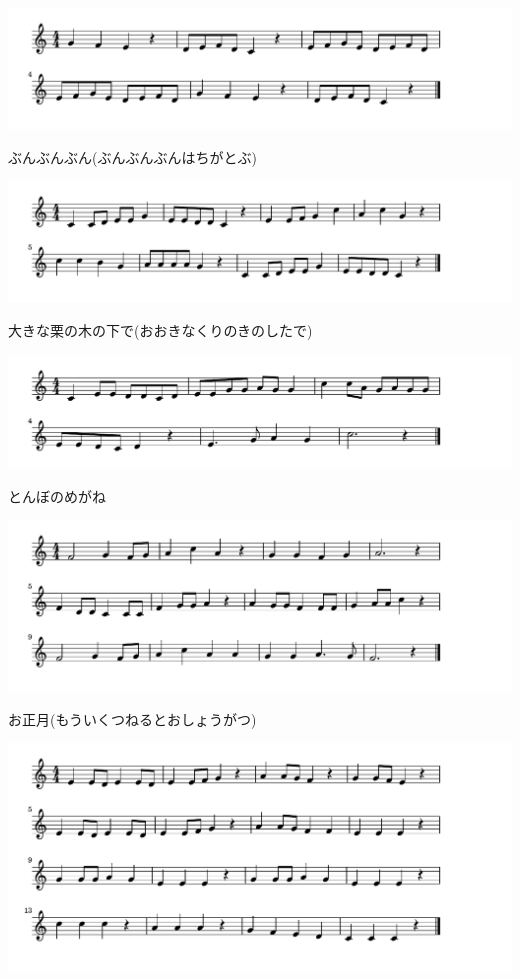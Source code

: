 \documentclass[a4paper]{ltjsarticle}
\begin{document}
\includegraphics[clip]{bunbunbun_crop.pdf}

\vspace{-10mm} \hspace{10mm}
ぶんぶんぶん(ぶんぶんぶんはちがとぶ)

\includegraphics[clip]{okinakuri_crop.pdf}

\vspace{-10mm} \hspace{10mm}
大きな栗の木の下で(おおきなくりのきのしたで)

\includegraphics[clip]{tonbono_crop.pdf}

\vspace{-10mm} \hspace{10mm}
とんぼのめがね

\includegraphics[clip]{oshogatsu_crop.pdf}

\vspace{-10mm} \hspace{10mm}
お正月(もういくつねるとおしょうがつ)

\includegraphics[clip]{tewotata_crop.pdf}
\end{document}
